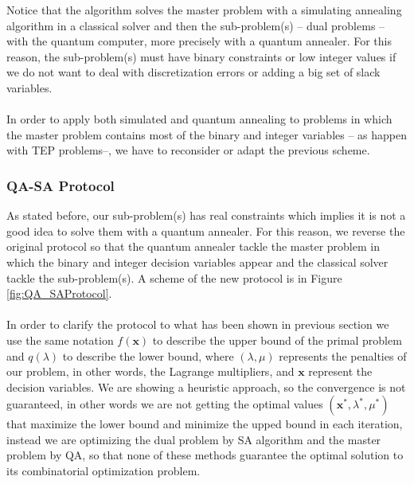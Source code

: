 Notice that the algorithm solves the master problem with a simulating annealing algorithm in a classical solver and then the sub-problem(s) -- dual problems -- with the quantum computer, more precisely with a quantum annealer. For this reason, the sub-problem(s) must have binary constraints or low integer values if we do not want to deal with discretization errors or adding a big set of slack variables.\\\\
In order to apply both simulated and quantum annealing to problems in which the master problem contains most of the binary and integer variables -- as happen with TEP problems--, we have to reconsider or adapt the previous scheme.
\subsubsection{QA-SA Protocol}
 As stated before, our sub-problem(s) has real constraints which implies it is not a good idea to solve them with a quantum annealer. For this reason, we reverse the original protocol so that the quantum annealer tackle the master problem in which the binary and integer decision variables appear and the classical solver tackle the sub-problem(s). A scheme of the new protocol is in Figure\,\ref{fig:QA_SAProtocol}.\\\\
In order to clarify the protocol to what has been shown in previous section we use the same notation $f(\textbf{x})$ to describe the upper bound of the primal problem and $q(\lambda)$ to describe the lower bound, where $(\lambda,\mu)$ represents the penalties of our problem, in other words, the Lagrange multipliers, and $\textbf{x}$ represent the decision variables. We are showing a heuristic approach, so the convergence is not guaranteed, in other words we are not getting the optimal values $(\textbf{x}^{*}, \lambda^{*},\mu^{*})$ that maximize the lower bound and minimize the upped bound in each iteration, instead we are optimizing the dual problem by SA algorithm and the master problem by QA, so that none of these methods guarantee the optimal solution to its combinatorial optimization problem.
